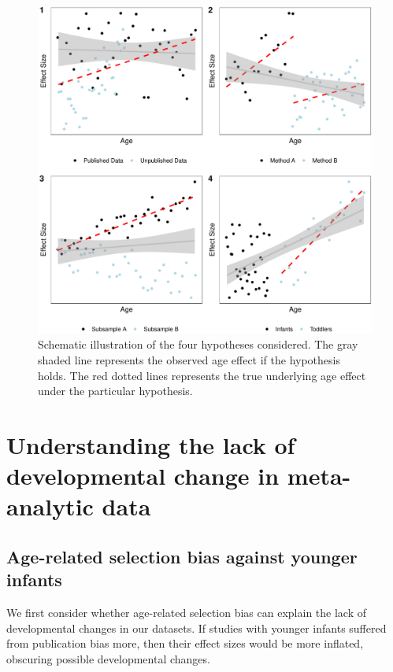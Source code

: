 \documentclass[
  man]{apa6}
\begin{document}
\begin{figure}
\centering
\includegraphics{00_main_files/figure-latex/unnamed-chunk-28-1.pdf}
\caption{\label{fig:unnamed-chunk-28}Schematic illustration of the four hypotheses considered. The gray shaded line represents the observed age effect if the hypothesis holds. The red dotted lines represents the true underlying age effect under the particular hypothesis.}
\end{figure}

\hypertarget{understanding-the-lack-of-developmental-change-in-meta-analytic-data}{%
\section{Understanding the lack of developmental change in meta-analytic data}\label{understanding-the-lack-of-developmental-change-in-meta-analytic-data}}

\hypertarget{age-related-selection-bias-against-younger-infants}{%
\subsection{Age-related selection bias against younger infants}\label{age-related-selection-bias-against-younger-infants}}

We first consider whether age-related selection bias can explain the lack of developmental changes in our datasets. If studies with younger infants suffered from publication bias more, then their effect sizes would be more inflated, obscuring possible developmental changes.
\end{document}

